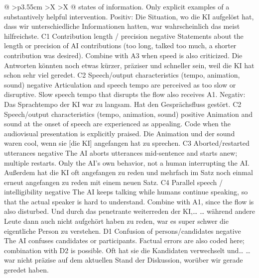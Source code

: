 \begin{xltabular}{\textwidth}{@{}
      >{\RaggedRight\arraybackslash}p{3.55cm}
      >{\RaggedRight\arraybackslash}X
      >{\RaggedRight\arraybackslash}X
    @{}}
{      states of information.}
      {Only explicit examples of a substantively helpful intervention.}
      {Positiv: Die Situation, wo die KI aufgelöst hat, dass wir unterschiedliche
      Informationen hatten, war wahrscheinlich das meist hilfreichste.}
    \cbcatbreak
    \cbrow
      {C1}
      {Contribution length / precision}
      {negative}
      {Statements about the length or precision of AI contributions (too long,
      talked too much, a shorter contribution was desired).}
      {Combine with A3 when speed is also criticized.}
      {Die Antworten könnten noch etwas kürzer, präziser und schneller sein, weil
      die KI hat schon sehr viel geredet.}
    \cbgap
    \cbrow
      {C2}
      {Speech/output characteristics (tempo, animation, sound)}
      {negative}
      {Articulation and speech tempo are perceived as too slow or disruptive.}
      {Slow speech tempo that disrupts the flow also receives A1.}
      {Negativ: Das Sprachtempo der KI war zu langsam. Hat den Gesprächsfluss
      gestört.}
    \cbgap
    \cbrow
      {C2}
      {Speech/output characteristics (tempo, animation, sound)}
      {positive}
      {Animation and sound at the onset of speech are experienced as appealing.}
      {Code when the audiovisual presentation is explicitly praised.}
      {Die Animation und der sound waren cool, wenn sie [die KI] angefangen hat zu
      sprechen.}
    \cbgap
    \cbrow
      {C3}
      {Aborted/restarted utterances}
      {negative}
      {The AI aborts utterances mid-sentence and starts anew; multiple restarts.}
      {Only the AI's own behavior, not a human interrupting the AI.}
      {Außerdem hat die KI oft angefangen zu reden und mehrfach im Satz noch einmal
      erneut angefangen zu reden mit einem neuen Satz.}
    \cbgap
    \cbrow
      {C4}
      {Parallel speech / intelligibility}
      {negative}
      {The AI keeps talking while humans continue speaking, so that the actual
      speaker is hard to understand.}
      {Combine with A1, since the flow is also disturbed.}
      {Und durch das penetrante weiterreden der KI,… … während andere Leute dann
      auch nicht aufgehört haben zu reden, war es super schwer die eigentliche
      Person zu verstehen.}
    \cbcatbreak
    \cbrow
      {D1}
      {Confusion of persons/candidates}
      {negative}
      {The AI confuses candidates or participants.}
      {Factual errors are also coded here; combination with D2 is possible.}
      {Oft hat sie die Kandidaten verwechselt und… … war nicht präzise auf dem
      aktuellen Stand der Diskussion, worüber wir gerade geredet haben.}

\end{xltabular}
